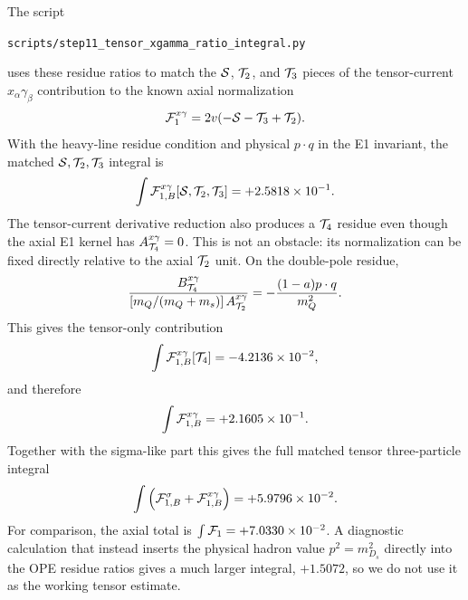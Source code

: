 \documentclass[11pt]{article}
\begin{document}
The script
\begin{center}
  \texttt{scripts/step11\_tensor\_xgamma\_ratio\_integral.py}
\end{center}
uses these residue ratios to match the ${\cal S}$, ${\cal T}_2$, and
${\cal T}_3$ pieces of the tensor-current $x_\alpha\gamma_\beta$ contribution
to the known axial normalization
\begin{equation}
  {\cal F}_1^{x\gamma}=2v(-{\cal S}-{\cal T}_3+{\cal T}_2).
\end{equation}
With the heavy-line residue condition and physical $p\cdot q$ in the E1
invariant, the matched ${\cal S},{\cal T}_2,{\cal T}_3$ integral is
\begin{equation}
  \int{\cal F}_{1,B}^{x\gamma}[{\cal S},{\cal T}_2,{\cal T}_3]
  =
  +2.5818\times 10^{-1}.
\end{equation}
The tensor-current derivative reduction also produces a ${\cal T}_4$ residue
even though the axial E1 kernel has $A_{{\cal T}_4}^{x\gamma}=0$.  This is not
an obstacle: its normalization can be fixed directly relative to the axial
${\cal T}_2$ unit.  On the double-pole residue,
\begin{equation}
  \frac{
    B_{{\cal T}_4}^{x\gamma}
  }{
    [m_Q/(m_Q+m_s)]\,A_{{\cal T}_2}^{x\gamma}
  }
  =
  -\frac{(1-a)p\cdot q}{m_Q^2}.
\end{equation}
This gives the tensor-only contribution
\begin{equation}
  \int{\cal F}_{1,B}^{x\gamma}[{\cal T}_4]
  =
  -4.2136\times 10^{-2},
\end{equation}
and therefore
\begin{equation}
  \int{\cal F}_{1,B}^{x\gamma}
  =
  +2.1605\times 10^{-1}.
\end{equation}
Together with the sigma-like part this gives the full matched tensor
three-particle integral
\begin{equation}
  \int\left(
    {\cal F}_{1,B}^{\sigma}
    +
    {\cal F}_{1,B}^{x\gamma}
  \right)
  =
  +5.9796\times 10^{-2}.
\end{equation}
For comparison, the axial total is
$\int{\cal F}_1=+7.0330\times 10^{-2}$.  A diagnostic calculation that instead
inserts the physical hadron value $p^2=m_{D_s}^2$ directly into the OPE
residue ratios gives a much larger integral, $+1.5072$, so we do not use it as
the working tensor estimate.
\end{document}
